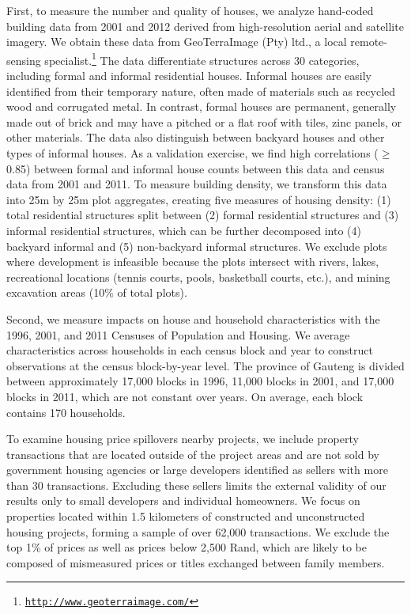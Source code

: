 \documentclass[12pt]{article}
\begin{document}
First, to measure the number and quality of houses, we analyze hand-coded building data from 2001 and 2012 derived from high-resolution aerial and satellite imagery. We obtain these data from GeoTerraImage (Pty) ltd., a local remote-sensing specialist.\footnote{\href{http://www.geoterraimage.com/}{\tt http://www.geoterraimage.com/}} The data differentiate structures across 30 categories, including formal and informal residential houses. Informal houses are easily identified from their temporary nature, often made of materials such as recycled wood and corrugated metal. In contrast, formal houses are permanent, generally made out of brick and may have a pitched or a flat roof with tiles, zinc panels, or other materials. The data also distinguish between backyard houses and other types of informal houses.  As a validation exercise, we find high correlations ($\geq$0.85) between formal and informal house counts between this data and census data from 2001 and 2011.  To measure building density, we transform this data into 25m by 25m plot aggregates, creating five measures of housing density: (1) total residential structures split between (2) formal residential structures and (3) informal residential structures, which can be further decomposed into (4) backyard informal and (5) non-backyard informal structures.  We exclude plots where development is infeasible because the plots intersect with rivers, lakes, recreational locations (tennis courts, pools, basketball courts, etc.), and mining excavation areas (10\% of total plots).  

Second, we measure impacts on house and household characteristics with the 1996, 2001, and 2011 Censuses of Population and Housing.  We average characteristics across households in each census block and year to construct observations at the census block-by-year level.  The province of Gauteng is divided between approximately 17,000 blocks in 1996, 11,000 blocks in 2001, and 17,000 blocks in 2011, which are not constant over years.  On average, each block contains 170 households.

To examine housing price spillovers nearby projects, we include property transactions that are located outside of the project areas and are not sold by government housing agencies or large developers identified as sellers with more than 30 transactions.  Excluding these sellers limits the external validity of our results only to small developers and individual homeowners.  We focus on properties located within 1.5 kilometers of constructed and unconstructed housing projects, forming a sample of over 62,000 transactions.  We exclude the top 1\% of prices as well as prices below 2,500 Rand, which are likely to be composed of mismeasured prices or titles exchanged between family members. 
\end{document}
